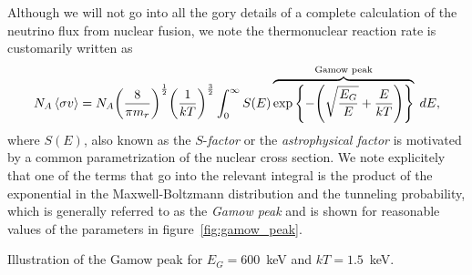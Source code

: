 Although we will not go into all the gory details of a complete calculation of the
neutrino flux from nuclear fusion, we note the thermonuclear reaction rate is
customarily written as
\begin{align}
  N_A \left<\sigma v\right> = N_A \qty(\frac{8}{\pi m_r})^\frac{1}{2} \qty(\frac{1}{kT})^{\frac{3}{2}}
  \int_0^\infty S(E)
  \overbrace{\exp\qty{-\qty(\sqrt{\frac{E_G}{E}} + \frac{E}{kT})}}^\text{Gamow peak} \;d{E},
\end{align}
where $S(E)$, also known as the $S$-\emph{factor} or the \emph{astrophysical factor}
is motivated by a common parametrization of the nuclear cross section.
We note explicitely that one of the terms that go into the relevant integral is
the product of the exponential in the Maxwell-Boltzmann distribution and the tunneling
probability, which is generally referred to as the \emph{Gamow peak} and is shown
for reasonable values of the parameters in figure~\ref{fig:gamow_peak}.

\begin{marginfigure}
  
  \caption{Illustration of the Gamow peak for $E_G = 600$~keV and $kT = 1.5$~keV.}
  \label{fig:gamow_peak}
\end{marginfigure}

